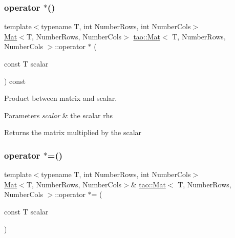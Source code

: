 \subsubsection{\texorpdfstring{operator $\ast$()}{operator *()}}
{\footnotesize\ttfamily template$<$typename T, int Number\+Rows, int Number\+Cols$>$ \\
\mbox{\hyperlink{classtao_1_1_mat}{Mat}}$<$T, Number\+Rows, Number\+Cols$>$ \mbox{\hyperlink{classtao_1_1_mat}{tao\+::\+Mat}}$<$ T, Number\+Rows, Number\+Cols $>$\+::operator $\ast$ (\begin{DoxyParamCaption}\item[{const T}]{scalar }\end{DoxyParamCaption}) const\hspace{0.3cm}{\ttfamily [inline]}}



Product between matrix and scalar. 


\begin{DoxyParams}{Parameters}
{\em scalar} & the scalar rhs \\
\hline
\end{DoxyParams}
\begin{DoxyReturn}{Returns}
the matrix multiplied by the scalar 
\end{DoxyReturn}
\mbox{\label{classtao_1_1_mat_ae684c7c3b2ccd9fc04b96170268a1af5}} 
\subsubsection{\texorpdfstring{operator $\ast$=()}{operator *=()}}
{\footnotesize\ttfamily template$<$typename T, int Number\+Rows, int Number\+Cols$>$ \\
\mbox{\hyperlink{classtao_1_1_mat}{Mat}}$<$T, Number\+Rows, Number\+Cols$>$\& \mbox{\hyperlink{classtao_1_1_mat}{tao\+::\+Mat}}$<$ T, Number\+Rows, Number\+Cols $>$\+::operator $\ast$= (\begin{DoxyParamCaption}\item[{const T}]{scalar }\end{DoxyParamCaption})\hspace{0.3cm}{\ttfamily [inline]}}



